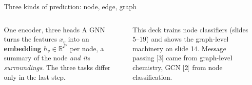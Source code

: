 \documentclass[aspectratio=169,10pt]{beamer}
\newcommand{\R}{\mathbb{R}}
\renewcommand{\cite}[1]{{\scriptsize\color{cTok}[#1]}}
\newcommand{\key}[1]{\textbf{\color{cAtt}#1}}
\begin{document}
\begin{frame}{Three kinds of prediction: node, edge, graph}
\vspace{0.5mm}
\begin{columns}[T,onlytextwidth]
\begin{block}{One encoder, three heads}
\footnotesize
A GNN turns the features $x_v$ into an \key{embedding} $h_v\in\R^{F'}$ per node, a summary of the node
\emph{and its surroundings}. The three tasks differ only in the last step.
\end{block}
\footnotesize
\vspace{1mm}
This deck trains node classifiers (slides 5--19) and shows the graph-level machinery on slide 14.
Message passing \cite{3} came from graph-level chemistry, GCN \cite{2} from node classification.
\end{columns}
\end{frame}
\end{document}
